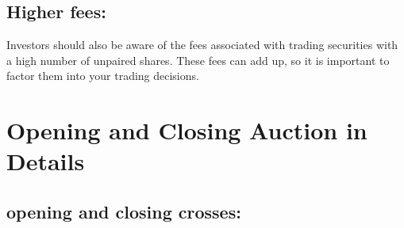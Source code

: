 \documentclass[11pt]{article}
\begin{document}
\subsection{Higher fees:}
\label{sec:orgc9cde51}
Investors should also be aware of the fees associated with trading securities with a high number of unpaired shares.
These fees can add up, so it is important to factor them into your trading decisions.


\section{Opening and Closing Auction in Details}
\label{sec:orga21739a}

\subsection{opening and closing crosses:}
\label{sec:orgf221ca2}
\end{document}
